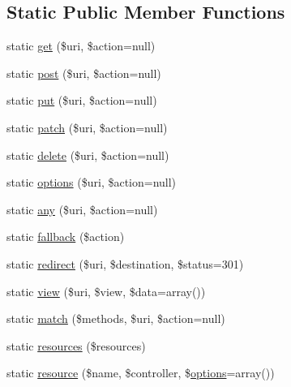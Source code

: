 \subsection*{Static Public Member Functions}
\begin{DoxyCompactItemize}
\item 
static \mbox{\hyperlink{class_illuminate_1_1_support_1_1_facades_1_1_route_a39cd5af406f569f04257beadad32f22a}{get}} (\$uri, \$action=null)
\item 
static \mbox{\hyperlink{class_illuminate_1_1_support_1_1_facades_1_1_route_a3e87a5845aaa31e93fcf49f6c3bb9c0f}{post}} (\$uri, \$action=null)
\item 
static \mbox{\hyperlink{class_illuminate_1_1_support_1_1_facades_1_1_route_ac147418c43c1fde624c9e9ee3a8b97e0}{put}} (\$uri, \$action=null)
\item 
static \mbox{\hyperlink{class_illuminate_1_1_support_1_1_facades_1_1_route_a07351975af02a62cda512488b3057038}{patch}} (\$uri, \$action=null)
\item 
static \mbox{\hyperlink{class_illuminate_1_1_support_1_1_facades_1_1_route_a9d7c9d2fb6b52af124f3d0d354048649}{delete}} (\$uri, \$action=null)
\item 
static \mbox{\hyperlink{class_illuminate_1_1_support_1_1_facades_1_1_route_a56299381f0cc42d0701d1149d6923d6d}{options}} (\$uri, \$action=null)
\item 
static \mbox{\hyperlink{class_illuminate_1_1_support_1_1_facades_1_1_route_acd44678d4fb5ef17bad21a70795df5f1}{any}} (\$uri, \$action=null)
\item 
static \mbox{\hyperlink{class_illuminate_1_1_support_1_1_facades_1_1_route_a3f0681b90b6ff2207c419498712a7ba4}{fallback}} (\$action)
\item 
static \mbox{\hyperlink{class_illuminate_1_1_support_1_1_facades_1_1_route_aabe01372a09b36ba51904a73c2ffa526}{redirect}} (\$uri, \$destination, \$status=301)
\item 
static \mbox{\hyperlink{class_illuminate_1_1_support_1_1_facades_1_1_route_a0ad562188e1e8adef7e084599b20fcf3}{view}} (\$uri, \$view, \$data=array())
\item 
static \mbox{\hyperlink{class_illuminate_1_1_support_1_1_facades_1_1_route_a883b4c2ff585ed08b6543af097a9fee0}{match}} (\$methods, \$uri, \$action=null)
\item 
static \mbox{\hyperlink{class_illuminate_1_1_support_1_1_facades_1_1_route_a474685a13bb6afbb588369b5abae1885}{resources}} (\$resources)
\item 
static \mbox{\hyperlink{class_illuminate_1_1_support_1_1_facades_1_1_route_a43f06987528f8a3f90ddb29395d93bd0}{resource}} (\$name, \$controller, \$\mbox{\hyperlink{class_illuminate_1_1_support_1_1_facades_1_1_route_a56299381f0cc42d0701d1149d6923d6d}{options}}=array())

\end{DoxyCompactItemize}
